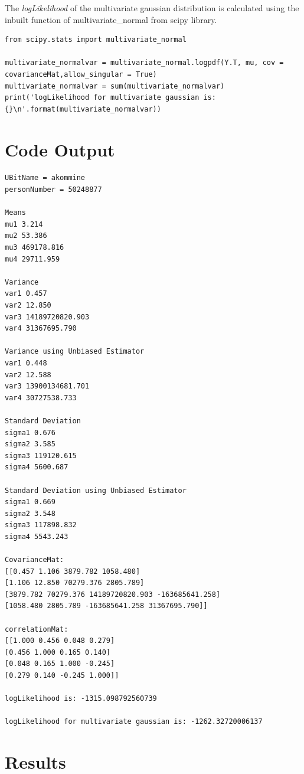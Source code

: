 \documentclass[a4paper,11pt]{article}
\begin{document}
{The \textit{logLikelihood} of the multivariate gaussian distribution is calculated using the inbuilt function of multivariate\_normal from scipy library.

\begin{lstlisting}[label={list:fourth},caption=Calculating logLikelihood for multivariate gaussian.]
from scipy.stats import multivariate_normal

multivariate_normalvar = multivariate_normal.logpdf(Y.T, mu, cov = covarianceMat,allow_singular = True)
multivariate_normalvar = sum(multivariate_normalvar)
print('logLikelihood for multivariate gaussian is: {}\n'.format(multivariate_normalvar))
\end{lstlisting}


\section*{Code Output}

\begin{lstlisting}[label={list:fifth},caption=Code output.]
UBitName = akommine
personNumber = 50248877

Means
mu1 3.214
mu2 53.386
mu3 469178.816
mu4 29711.959

Variance
var1 0.457
var2 12.850
var3 14189720820.903
var4 31367695.790

Variance using Unbiased Estimator
var1 0.448
var2 12.588
var3 13900134681.701
var4 30727538.733

Standard Deviation
sigma1 0.676
sigma2 3.585
sigma3 119120.615
sigma4 5600.687

Standard Deviation using Unbiased Estimator
sigma1 0.669
sigma2 3.548
sigma3 117898.832
sigma4 5543.243

CovarianceMat:
[[0.457 1.106 3879.782 1058.480]
[1.106 12.850 70279.376 2805.789]
[3879.782 70279.376 14189720820.903 -163685641.258]
[1058.480 2805.789 -163685641.258 31367695.790]]

correlationMat:
[[1.000 0.456 0.048 0.279]
[0.456 1.000 0.165 0.140]
[0.048 0.165 1.000 -0.245]
[0.279 0.140 -0.245 1.000]]

logLikelihood is: -1315.098792560739

logLikelihood for multivariate gaussian is: -1262.32720006137
\end{lstlisting}

\section*{Results}

}
\end{document}
